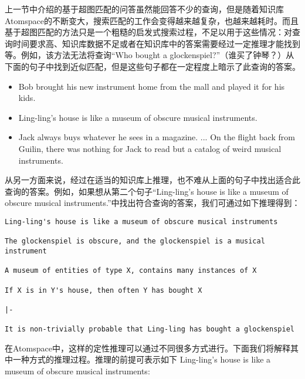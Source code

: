 上一节中介绍的基于超图匹配的问答虽然能回答不少的查询，但是随着知识库Atomspace的不断变大，搜索匹配的工作会变得越来越复杂，也越来越耗时。而且基于超图匹配的方法只是一个粗糙的启发式搜索过程，不足以用于这些情况：对查询时间要求高、知识库数据不足或者在知识库中的答案需要经过一定推理才能找到等。例如，该方法无法将查询“Who bought a glockenspiel?”（谁买了钟琴？）从下面的句子中找到近似匹配，但是这些句子都在一定程度上暗示了此查询的答案。

\begin{itemize}
\item Bob brought his new instrument home from the mall and played it for his kids.
\item Ling-ling's house is like a museum of obscure musical instruments.
\item Jack always buys whatever he sees in a magazine. ... On the flight back from Guilin, there was nothing for Jack to read but a catalog of weird musical instruments.
\end{itemize}

从另一方面来说，经过在适当的知识库上推理，也不难从上面的句子中找出适合此查询的答案。例如，如果想从第二个句子“Ling-ling's house is like a museum of obscure musical instruments.”中找出符合查询的答案，我们可通过如下推理得到：

\begin{verbatim}
Ling-ling's house is like a museum of obscure musical instruments

The glockenspiel is obscure, and the glockenspiel is a musical instrument

A museum of entities of type X, contains many instances of X

If X is in Y's house, then often Y has bought X

|-

It is non-trivially probable that Ling-ling has bought a glockenspiel
\end{verbatim}

在Atomspace中，这样的定性推理可以通过不同很多方式进行。下面我们将解释其中一种方式的推理过程。推理的前提可表示如下
Ling-ling's house is like a museum of obscure musical instruments:

